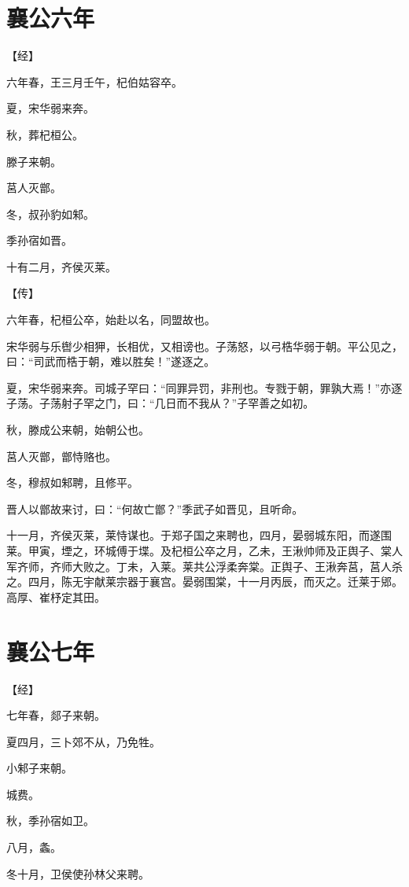 \documentclass[a4paper,12pt,UTF8,twoside]{ctexbook}
\begin{document}
\chapter{襄公六年}



【经】

六年春，王三月壬午，杞伯姑容卒。

夏，宋华弱来奔。

秋，葬杞桓公。

滕子来朝。

莒人灭鄫。

冬，叔孙豹如邾。

季孙宿如晋。

十有二月，齐侯灭莱。

【传】

六年春，杞桓公卒，始赴以名，同盟故也。

宋华弱与乐辔少相狎，长相优，又相谤也。子荡怒，以弓梏华弱于朝。平公见之，曰：“司武而梏于朝，难以胜矣！”遂逐之。

夏，宋华弱来奔。司城子罕曰：“同罪异罚，非刑也。专戮于朝，罪孰大焉！”亦逐子荡。子荡射子罕之门，曰：“几日而不我从？”子罕善之如初。

秋，滕成公来朝，始朝公也。

莒人灭鄫，鄫恃赂也。

冬，穆叔如邾聘，且修平。

晋人以鄫故来讨，曰：“何故亡鄫？”季武子如晋见，且听命。

十一月，齐侯灭莱，莱恃谋也。于郑子国之来聘也，四月，晏弱城东阳，而遂围莱。甲寅，堙之，环城傅于堞。及杞桓公卒之月，乙未，王湫帅师及正舆子、棠人军齐师，齐师大败之。丁未，入莱。莱共公浮柔奔棠。正舆子、王湫奔莒，莒人杀之。四月，陈无宇献莱宗器于襄宫。晏弱围棠，十一月丙辰，而灭之。迁莱于郳。高厚、崔杼定其田。



\chapter{襄公七年}



【经】

七年春，郯子来朝。

夏四月，三卜郊不从，乃免牲。

小邾子来朝。

城费。

秋，季孙宿如卫。

八月，螽。

冬十月，卫侯使孙林父来聘。
\end{document}
